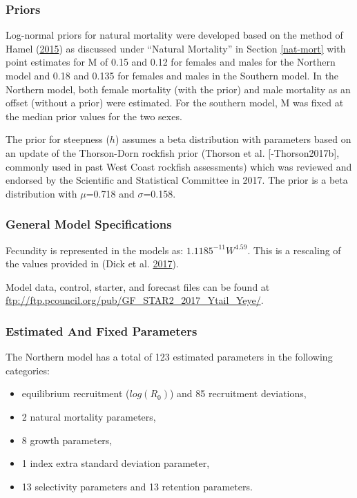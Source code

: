 \documentclass[12pt,]{article}
\providecommand{\tightlist}{%
  \setlength{\itemsep}{0pt}\setlength{\parskip}{0pt}}
\begin{document}
\subsubsection{\texorpdfstring{Priors
\label{priors}}{Priors }}\label{priors}

Log-normal priors for natural mortality were developed based on the
method of Hamel (\protect\hyperlink{ref-Hamel2015}{2015}) as discussed
under ``Natural Mortality'' in Section \ref{nat-mort} with point
estimates for M of 0.15 and 0.12 for females and males for the Northern
model and 0.18 and 0.135 for females and males in the Southern model. In
the Northern model, both female mortality (with the prior) and male
mortality as an offset (without a prior) were estimated. For the
southern model, M was fixed at the median prior values for the two
sexes.

The prior for steepness (\(h\)) assumes a beta distribution with
parameters based on an update of the Thorson-Dorn rockfish prior
(Thorson et al. {[}-Thorson2017b{]}, commonly used in past West Coast
rockfish assessments) which was reviewed and endorsed by the Scientific
and Statistical Committee in 2017. The prior is a beta distribution with
\(\mu\)=0.718 and \(\sigma\)=0.158.

\subsubsection{General Model
Specifications}\label{general-model-specifications}

Fecundity is represented in the models as: \(1.1185^{-11}W^{4.59}\).
This is a rescaling of the values provided in (Dick et al.
\protect\hyperlink{ref-Dick2017}{2017}).

Model data, control, starter, and forecast files can be found at
\url{ftp://ftp.pcouncil.org/pub/GF_STAR2_2017_Ytail_Yeye/}.

\subsubsection{Estimated And Fixed
Parameters}\label{estimated-and-fixed-parameters}

The Northern model has a total of 123 estimated parameters in the
following categories:

\begin{itemize}
\tightlist
\item
  equilibrium recruitment (\(log(R_0)\)) and 85 recruitment deviations,
\item
  2 natural mortality parameters,
\item
  8 growth parameters,
\item
  1 index extra standard deviation parameter,
\item
  13 selectivity parameters and 13 retention parameters.
\end{itemize}
\end{document}
